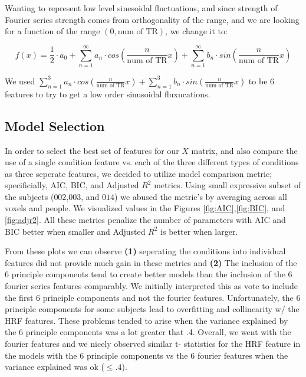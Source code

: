 \noindent Wanting to represent low level sinesoidal fluctuations, and since strength 
of Fourier series strength comes from orthogonality of the range, and we are 
looking for a function of the range $(0, \text{num of TR})$, we change it to:

\begin{equation}
f(x) = \frac{1}{2} \cdot a_0 + \sum_{n=1}^{\infty} a_n \cdot cos(\frac{n}{\text{num of TR}} x) + \sum_{n=1}^{\infty} b_n \cdot sin(\frac{n}{\text{num of TR}} x)
\end{equation}

\noindent We used $ \sum_{n=1}^{3} a_n \cdot cos(\frac{n}{\text{num of TR}} x) + 
\sum_{n=1}^{3} b_n \cdot sin(\frac{n}{\text{num of TR}} x)$ to be 6 features to try 
to get a low order sinusoidal fluxucations.

\subsection{Model Selection} \label{model_selection}

\par In order to select the best set of features for our $X$ matrix, and also 
compare the use of a single condition feature vs. each of the three different 
types of conditions as three seperate features, we decided to utilize model 
comparison metric; specificially, AIC, BIC, and Adjusted $R^2$ metrics. Using small 
expressive subset of the subjects ($002$,$003$, and $014$) we abused the 
metric's by averaging across all voxels and people.  We visualized values in 
the Figures \ref{fig:AIC},\ref{fig:BIC}, and \ref{fig:adjr2}. All these metrics 
penalize the number of parameters with AIC and BIC better when smaller and 
Adjusted $R^2$ is better when larger.

\par From these plots we can observe \textbf{(1)} seperating the conditions into
individual features did not provide much gain in these metrics and \textbf{(2)}
The inclusion of the 6 principle components tend to create better models than the 
inclusion of the 6 fourier series features comparably. We initially interpreted 
this as vote to include the first 6 principle components and not the fourier 
features. Unfortunately, the 6 principle components for some subjects lead to 
overfitting and collinearity w/ the HRF features. These problems tended to arise
when the variance explained by the 6 principle components was a lot greater that .4.
Overall, we went with the fourier features and we nicely observed similar t-
statistics for the HRF feature in the models with the 6 principle components vs
the 6 fourier features when the variance explained was ok ($\leq .4$).


